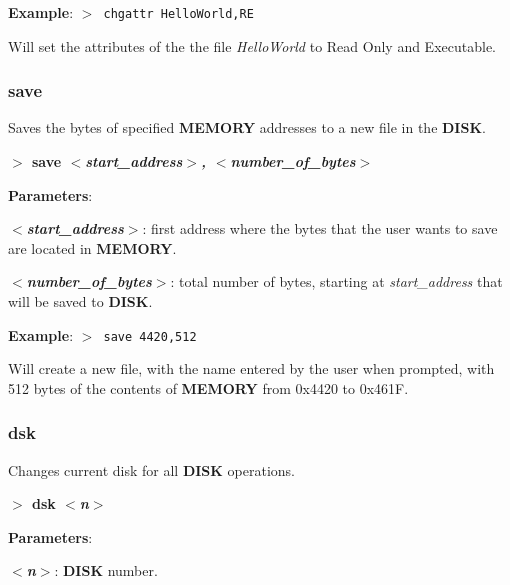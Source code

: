 \documentclass[a4paper,11pt]{article}
\begin{document}
        \textbf{Example}: \texttt{$>$ chgattr HelloWorld,RE}

        Will set the attributes of the the file \textit{HelloWorld} to Read Only
        and Executable.

        \subsubsection{{\color{blue}save}}
        Saves the bytes of specified \textbf{MEMORY} addresses to a new file in
        the \textbf{DISK}.

        \hspace{1.9cm}\textbf{$>$ save \textit{$<$start\_address$>$,
        $<$number\_of\_bytes$>$}}

        \textbf{Parameters}:

        \hspace{1cm}\textbf{\textit{$<$start\_address$>$}}: first address where
        the bytes that the user wants to save are located in \textbf{MEMORY}.

        \hspace{1cm}\textbf{\textit{$<$number\_of\_bytes$>$}}: total number of
        bytes, starting at \textit{start\_address} that will be saved to
        \textbf{DISK}.
        
        \textbf{Example}: \texttt{$>$ save 4420,512}

        Will create a new file, with the name entered by the user when prompted,
        with 512 bytes of the contents of \textbf{MEMORY} from 0x4420 to 0x461F.

        \subsubsection{{\color{blue}dsk}}\label{cmd:dsk}
        Changes current disk for all \textbf{DISK} operations.

        \hspace{1.9cm}\textbf{$>$ dsk \textit{$<$n$>$}}

        \textbf{Parameters}:

        \hspace{1cm}\textbf{\textit{$<$n$>$}}: \textbf{DISK} number.
\end{document}
